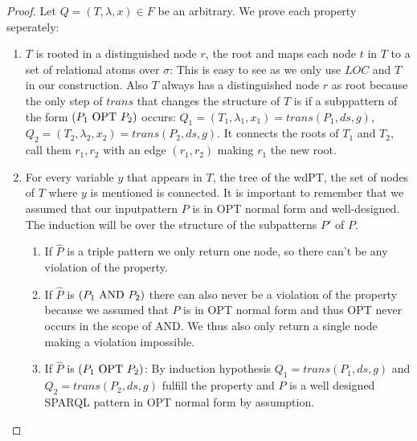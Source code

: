 \begin{proof}
	Let $Q=(T,\lambda,x) \in F$ be an arbitrary. We prove each property seperately:
	\begin{enumerate}
		\item $T$ is rooted in a distinguished node $r$, the root and maps
			each node $t$ in  $T$ to a set of relational atoms over $\sigma$:
			This is easy to see as we only use $LOC$ and $T$ in our
			construction. Also $T$ always has a distinguished node $r$ as root
			because the only step of $trans$ that changes the structure of $T$
			is if a subppattern of the form $(P_1 \mbox{ OPT } P_2)$ occurs: 
			$Q_1 = (T_1,\lambda_1,x_1)  = trans(P_1,ds,g)$,
			$Q_2 = (T_2,\lambda_2,x_2)  = trans(P_2,ds,g)$. 
			It connects the roots of $T_1$ and $T_2$, call them $r_1,r_2$ with
			an edge $(r_1,r_2)$ making $r_1$ the new root.  

		\item For every variable $y$ that appears
			in $T$, the tree of the wdPT, the set of nodes of $T$ where $y$ is mentioned is connected.
			It is important to remember that we assumed that our inputpattern $P$ is 
			in OPT normal form and well-designed.
			The induction will be over the structure of the subpatterns $P'$ of $P$.
			\begin{enumerate}
				\item If $\hat{P}$ is a triple pattern we only return one node, so there can't be any
					violation of the property.

				\item If $\hat{P}$ is $(P_1 \mbox{ AND }  P_2)$ there can also never be a violation of the
					property because we assumed that $P$ is in OPT normal form and thus OPT never
					occurs in the scope of AND. We thus also only return a single node making a
					violation impossible.

				\item If $\hat{P}$ is $(P_1 \mbox{ OPT }  P_2)$:
					By induction hypothesis $Q_1 = trans(P_1,ds,g)$ and $Q_2 =
					trans(P_2,ds,g)$ fulfill the property and $P$ 
					is a well designed SPARQL pattern in OPT normal form by assumption. 


\end{enumerate}
\end{enumerate}
\end{proof}
